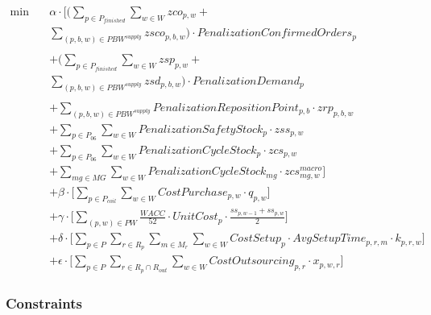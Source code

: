 \documentclass{article}
\begin{document}
\begin{equation}
\begin{aligned}
\min \quad & \alpha \cdot \Biggl[
    \Big(\sum_{p \in P_{finished}} \sum_{w \in W} \!\!  zco_{p,w}  + \\ 
    & \sum_{(p,b,w) \in PBW^{supply}} zsco_{p,b,w} \Big) \cdot PenalizationConfirmedOrders_p\\
    \\
    & + \Big( \sum_{p \in P_{finished}} \sum_{w \in W}  \!\!  zsp_{p,w}  + \\
    & \sum_{(p,b,w) \in PBW^{supply}} zsd_{p,b,w} \Big) \cdot PenalizationDemand_p \\
    \\
    & + \sum_{(p,b,w) \in PBW^{supply}} PenalizationRepositionPoint_{p,b} \cdot zrp_{p,b,w} \\
    & + \sum_{p \in P_{06}} \sum_{w \in W}  \!\! PenalizationSafetyStock_p \cdot zss_{p,w} \\
    & + \sum_{p \in P_{06}} \sum_{w \in W}  \!\! PenalizationCycleStock_p \cdot zcs_{p,w} \\
    & + \sum_{mg \in MG} \sum_{w \in W}  \!\! PenalizationCycleStock_{mg} \cdot zcs^{macro}_{mg,w} \Biggr] \\
    & + \beta \cdot \Biggl[ \sum_{p \in P_{coil}} \sum_{w \in W} CostPurchase_{p,w} \cdot q_{p,w} \Biggr] \\
    & + \gamma \cdot \Biggl[
    \sum_{(p,w) \in PW} \frac{WACC}{52} \cdot UnitCost_p \cdot 
    \frac{ss_{p,w-1} + ss_{p,w}}{2}
    \Biggr] \\    & + \delta \cdot \Biggl[\sum_{p \in P} \sum_{r \in R_p} \sum_{m \in M_r} \sum_{w \in W} CostSetup_p \cdot AvgSetupTime_{p,r,m} \cdot k_{p,r,w}
    \Biggr]\\
    & + \epsilon \cdot \Biggl[
    \sum_{p \in P} \sum_{r \in R_p \cap R_{out}} 
    \sum_{w \in W} CostOutsourcing_{p,r} \cdot x_{p,w,r}
    \Biggr]
\end{aligned}
\label{eq:of}
\end{equation}



\subsubsection{Constraints}
\end{document}
